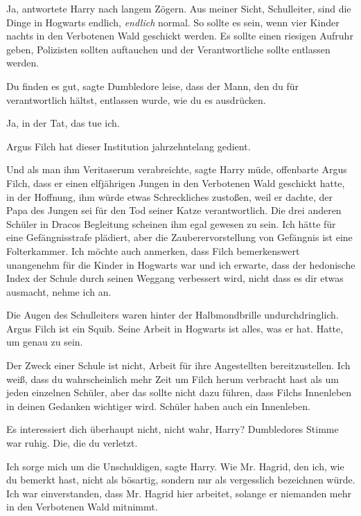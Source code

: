 \glqq{}Ja\grqq{}, antwortete Harry nach langem Zögern. \glqq{}Aus meiner Sicht,
Schulleiter, sind die Dinge in Hogwarts endlich, \emph{endlich} normal. So
sollte es sein, wenn vier Kinder nachts in den Verbotenen Wald geschickt werden.
Es sollte einen riesigen Aufruhr geben, Polizisten sollten auftauchen und der
Verantwortliche sollte entlassen werden.\grqq{}

\glqq{}Du finden es gut\grqq{}, sagte Dumbledore leise, \glqq{}dass der Mann, den
du für verantwortlich hältst, entlassen wurde, wie du es ausdrücken.\grqq{}

\glqq{}Ja, in der Tat, das tue ich.\grqq{}

\glqq{}Argus Filch hat dieser Institution jahrzehntelang gedient.\grqq{}

\glqq{}Und als man ihm Veritaserum verabreichte\grqq{}, sagte Harry müde, \glqq{}
offenbarte Argus Filch, dass er einen elfjährigen Jungen in den Verbotenen Wald
geschickt hatte, in der Hoffnung, ihm würde etwas Schreckliches zustoßen, weil
er dachte, der Papa des Jungen sei für den Tod seiner Katze verantwortlich. Die
drei anderen Schüler in Dracos Begleitung scheinen ihm egal gewesen zu sein. Ich
hätte für eine Gefängnisstrafe plädiert, aber die Zauberervorstellung von
Gefängnis ist eine Folterkammer. Ich möchte auch anmerken, dass Filch
bemerkenswert unangenehm für die Kinder in Hogwarts war und ich erwarte, dass
der hedonische Index der Schule durch seinen Weggang verbessert wird, nicht dass
es dir etwas ausmacht, nehme ich an.\grqq{}

Die Augen des Schulleiters waren hinter der Halbmondbrille undurchdringlich.
\glqq{}Argus Filch ist ein Squib. Seine Arbeit in Hogwarts ist alles, was er hat.
Hatte, um genau zu sein.\grqq{}

\glqq{}Der Zweck einer Schule ist nicht, Arbeit für ihre Angestellten
bereitzustellen. Ich weiß, dass du wahrscheinlich mehr Zeit um Filch herum
verbracht hast als um jeden einzelnen Schüler, aber das sollte nicht dazu
führen, dass Filchs Innenleben in deinen Gedanken wichtiger wird. Schüler haben
auch ein Innenleben.\grqq{}

\glqq{}Es interessiert dich überhaupt nicht, nicht wahr, Harry?\grqq{}
Dumbledores Stimme war ruhig. \glqq{}Die, die du verletzt.\grqq{}

\glqq{}Ich sorge mich um die Unschuldigen\grqq{}, sagte Harry. \glqq{}Wie Mr.
Hagrid, den ich, wie du bemerkt hast, nicht als bösartig, sondern nur als
vergesslich bezeichnen würde. Ich war einverstanden, dass Mr. Hagrid hier
arbeitet, solange er niemanden mehr in den Verbotenen Wald mitnimmt.\grqq{}

